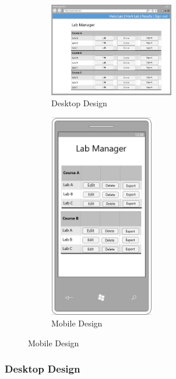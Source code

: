 \documentclass[12pt]{article}  %
\begin{document}
\begin{figure}[H]
\caption{Lab Manager Page}
\label{fig:manage-page}
\centering
\begin{subfigure}[c]{0.65\textwidth}
    \centering
    \includegraphics[width=0.6\textwidth]{images/design/manager-desktop.png}
    \caption{Desktop Design}
    \label{fig:design-manager-pc}
\end{subfigure}
\hfill
\begin{subfigure}[c]{0.3\textwidth}
    \centering
    \includegraphics[width=0.5\textwidth]{images/design/manager-mobile.png}
    \caption{Mobile Design}
    \label{fig:design-manager-mb}
\end{subfigure}
\end{figure}

\subsubsection*{Desktop Design}
\end{document}
